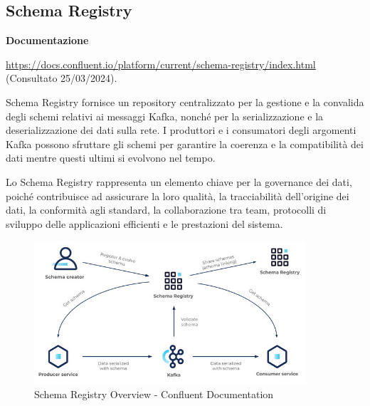 \subsection{Schema Registry} \label{sec:schema_registry}

\textbf{Documentazione}

\href{https://docs.confluent.io/platform/current/schema-registry/index.html}{https://docs.confluent.io/platform/current/schema-registry/index.html} (Consultato 25/03/2024).

Schema Registry fornisce un repository centralizzato per la gestione e la convalida degli schemi relativi ai messaggi Kafka, nonché per la serializzazione e la deserializzazione dei dati sulla rete. I produttori e i consumatori degli argomenti Kafka possono sfruttare gli schemi per garantire la coerenza e la compatibilità dei dati mentre questi ultimi si evolvono nel tempo.

Lo Schema Registry rappresenta un elemento chiave per la governance dei dati, poiché contribuisce ad assicurare la loro qualità, la tracciabilità dell'origine dei dati, la conformità agli standard, la collaborazione tra team, protocolli di sviluppo delle applicazioni efficienti e le prestazioni del sistema.

\begin{figure}[H]
    \centering
    \includegraphics[width=0.9\textwidth]{../Images/SpecificaTecnica/schemaRegistry.jpg}
    \caption{Schema Registry Overview - Confluent Documentation}
    \label{fig:schemaReg}
\end{figure}

